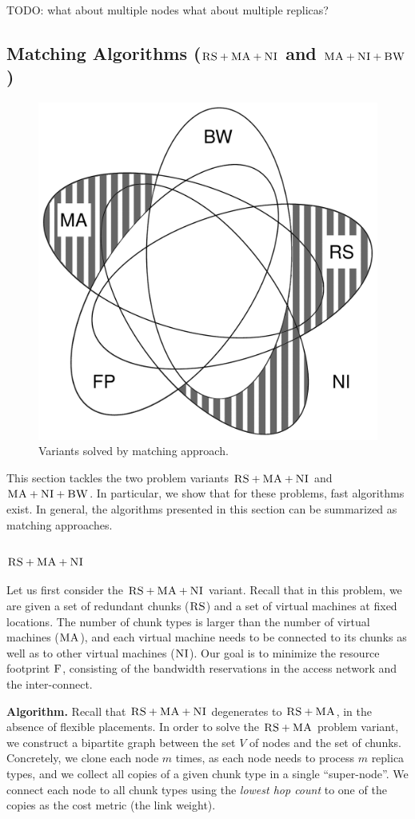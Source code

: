 \documentclass[9pt]{sigcomm-alternate}
\newcommand{\MaFactor}{m}
\newcommand{\ChunkType}{\tau}
\newcommand{\VirtualNodes}{\ensuremath{V}}
\newcommand{\CC}{\textsc{NI}}
\newcommand{\RS}{\textsc{RS}}
\newcommand{\BW}{\textsc{BW}}
\newcommand{\MA}{\textsc{MA}}
\newcommand{\Cost}{\textsc{F}}
\begin{document}

TODO: what about multiple nodes what about multiple replicas?

\subsection{Matching Algorithms ($\RS+\MA+\CC$ and $\MA+\CC+\BW$)}\label{ssec:match}

\begin{figure}
\includegraphics[width=0.48\columnwidth]{figs/venn_matching.pdf}
\caption{Variants solved by matching approach.}
\label{fig:venn_match}
\end{figure}

This section tackles the two problem variants
$\RS+\MA+\CC$ and $\MA+\CC+\BW$. In particular, we show that
for these problems, fast algorithms exist.
In general, the algorithms presented in this section can be summarized
as matching approaches.

\subsubsection{$\RS+\MA+\CC$}

Let us first consider the $\RS+\MA+\CC$ variant.
Recall that in this problem,
we are given a set of redundant chunks ($\RS$) and a set of virtual machines
at fixed locations. The number of chunk types is larger than the number
of virtual machines ($\MA$), and each virtual machine needs to be connected
to its chunks as well as to other virtual machines ($\CC$).
Our goal is to minimize the resource footprint $\Cost$, consisting
of the bandwidth reservations in the access network and the inter-connect.

\textbf{Algorithm.} Recall that $\RS+\MA+\CC$ degenerates to $\RS+\MA$,
in the absence of flexible placements. 
In order to solve the $\RS+\MA$ problem variant,
we construct a bipartite
graph between the set
$\VirtualNodes$ of nodes and
the set of chunks.
Concretely, we clone each node $\MaFactor$ times,
as each node needs to process
$\MaFactor$ replica types, and we collect all copies of a given chunk type in a
single %
``super-node''. We connect each node to all chunk types using the
\emph{lowest hop count} to one of the copies as the cost metric (the link weight).
\end{document}
